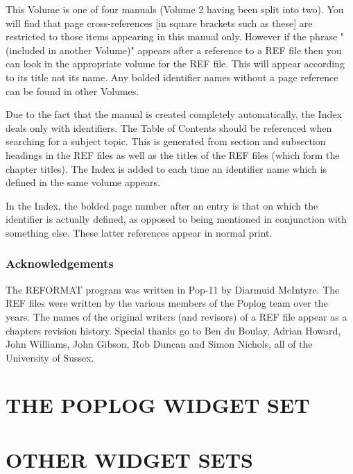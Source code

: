 This Volume is one of four manuals (Volume 2 having been split into
two). You will find that page cross-references [in square brackets such
as these] are restricted to those items appearing in this manual only.
However if the phrase "(included in another Volume)" appears after a
reference to a REF file then you can look in the appropriate volume for
the REF file. This will appear according to its title not its name.
	Any bolded identifier names without a page reference can be found in
other Volumes.


Due to the fact that the manual is created completely automatically, the
Index deals only with identifiers. The Table of Contents should be
referenced when searching for a subject topic. This is generated from
section and subsection headings in the REF files as well as the titles
of the REF files (which form the chapter titles). The Index is added to each
time an identifier name which is defined in the same volume appears.


	 In the Index, the bolded page number after an entry is that on
which the identifier is actually defined, as opposed to being mentioned
in conjunction with something else. These latter references appear in
normal print.


\section*{Acknowledgements}

The REFORMAT program was written in Pop-11 by Diarmuid McIntyre. The REF
files were written by the various members of the Poplog team over the
years. The names of the original writers (and revisors) of a REF file
appear as a chapters revision history. Special thanks go to Ben du
Boulay, Adrian Howard, John Williams, John Gibson, Rob Duncan and Simon
Nichols, all of the University of Sussex.


\tableofcontents




\part{THE POPLOG WIDGET SET}



\part{OTHER WIDGET SETS}

